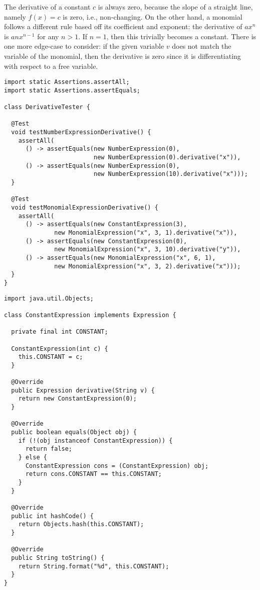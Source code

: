 The derivative of a constant $c$ is always zero, because the slope of a straight line, namely $f(x) = c$ is zero, i.e., non-changing. On the other hand, a monomial follows a different rule based off its coefficient and exponent: the derivative of $ax^n$ is $anx^{n-1}$ for any $n > 1$. If $n=1$, then this trivially becomes a constant. There is one more edge-case to consider: if the given variable $v$ does not match the variable of the monomial, then the derivative is zero since it is differentiating with respect to a free variable. 

\begin{lstlisting}[language=MyJava]
import static Assertions.assertAll;
import static Assertions.assertEquals;

class DerivativeTester {

  @Test
  void testNumberExpressionDerivative() {
    assertAll(
      () -> assertEquals(new NumberExpression(0),
                         new NumberExpression(0).derivative("x")),
      () -> assertEquals(new NumberExpression(0),
                         new NumberExpression(10).derivative("x")));
  }

  @Test
  void testMonomialExpressionDerivative() {
    assertAll(
      () -> assertEquals(new ConstantExpression(3),
              new MonomialExpression("x", 3, 1).derivative("x")),
      () -> assertEquals(new ConstantExpression(0),
              new MonomialExpression("x", 3, 10).derivative("y")),
      () -> assertEquals(new MonomialExpression("x", 6, 1),
              new MonomialExpression("x", 3, 2).derivative("x")));
  }
}
\end{lstlisting}


\begin{lstlisting}[language=MyJava]
import java.util.Objects;

class ConstantExpression implements Expression {

  private final int CONSTANT;

  ConstantExpression(int c) { 
    this.CONSTANT = c; 
  }

  @Override
  public Expression derivative(String v) { 
    return new ConstantExpression(0); 
  }

  @Override
  public boolean equals(Object obj) {
    if (!(obj instanceof ConstantExpression)) { 
      return false; 
    } else { 
      ConstantExpression cons = (ConstantExpression) obj;
      return cons.CONSTANT == this.CONSTANT; 
    }
  }

  @Override
  public int hashCode() { 
    return Objects.hash(this.CONSTANT); 
  }

  @Override
  public String toString() { 
    return String.format("%d", this.CONSTANT); 
  }
}
\end{lstlisting}

